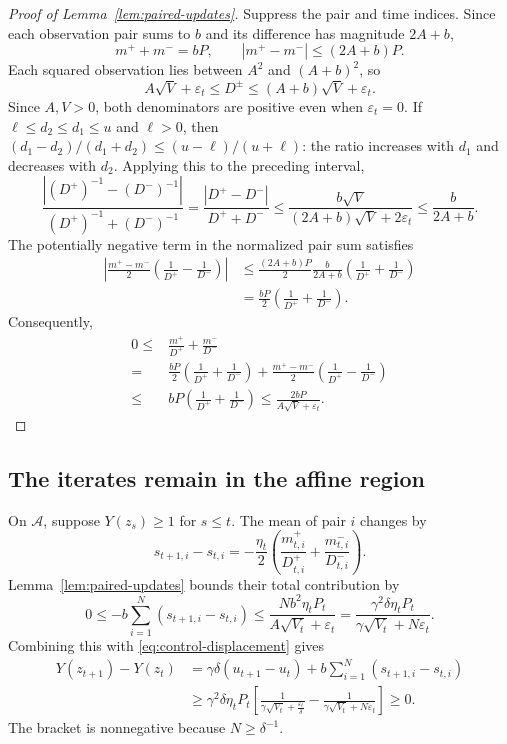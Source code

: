 \documentclass[11pt,letterpaper]{article}
\theoremstyle{definition}
\newcommand{\eps}{\varepsilon}
\begin{document}
\begin{proof}[Proof of Lemma~\ref{lem:paired-updates}]
Suppress the pair and time indices. Since each observation pair sums to
$b$ and its difference has magnitude $2A+b$,
\[
m^++m^-=bP,\qquad |m^+-m^-|\le(2A+b)P.
\]
Each squared observation lies between $A^2$ and $(A+b)^2$, so
\[
A\sqrt V+\eps_t\le D^\pm\le(A+b)\sqrt V+\eps_t.
\]
Since $A,V>0$, both denominators are positive even when $\eps_t=0$.
If $\ell\le d_2\le d_1\le u$ and $\ell>0$, then
$(d_1-d_2)/(d_1+d_2)\le(u-\ell)/(u+\ell)$: the ratio increases with
$d_1$ and decreases with $d_2$. Applying this to the preceding interval,
\begin{equation}
\frac{|(D^+)^{-1}-(D^-)^{-1}|}{(D^+)^{-1}+(D^-)^{-1}}
=\frac{|D^+-D^-|}{D^++D^-}
\le\frac{b\sqrt V}{(2A+b)\sqrt V+2\eps_t}
\le\frac{b}{2A+b}.
\label{eq:pair-denominator-difference}
\end{equation}
The potentially negative term in the normalized pair sum satisfies
\begin{align*}
\left|\frac{m^+-m^-}{2}
\left(\frac1{D^+}-\frac1{D^-}\right)\right|
&\le\frac{(2A+b)P}{2}\frac{b}{2A+b}
\left(\frac1{D^+}+\frac1{D^-}\right)\\
&=\frac{bP}{2}\left(\frac1{D^+}+\frac1{D^-}\right).
\end{align*}
Consequently,
\begin{align*}
0\le{}&
\frac{m^+}{D^+}+\frac{m^-}{D^-}
\\
={}&\frac{bP}{2}\left(\frac1{D^+}+\frac1{D^-}\right)
+\frac{m^+-m^-}{2}\left(\frac1{D^+}-\frac1{D^-}\right)
\\
\le{}& bP\left(\frac1{D^+}+\frac1{D^-}\right)
\le\frac{2bP}{A\sqrt V+\eps_t}.
\end{align*}
\end{proof}

\subsection{The iterates remain in the affine region}

On $\mathcal A$, suppose $Y(z_s)\ge1$ for $s\le t$. The mean of pair $i$
changes by
\[
s_{t+1,i}-s_{t,i}
=-\frac{\eta_t}{2}\left(
\frac{m_{t,i}^{+}}{D_{t,i}^{+}}+
\frac{m_{t,i}^{-}}{D_{t,i}^{-}}\right).
\]
Lemma~\ref{lem:paired-updates} bounds their total contribution by
\begin{equation}
0\le-b\sum_{i=1}^N(s_{t+1,i}-s_{t,i})
\le\frac{Nb^2\eta_tP_t}{A\sqrt{V_t}+\eps_t}
=\frac{\gamma^2\delta\eta_tP_t}{\gamma\sqrt{V_t}+N\eps_t}.
\label{eq:pair-mean-step}
\end{equation}
Combining this with \eqref{eq:control-displacement} gives
\begin{equation}
\begin{aligned}
Y(z_{t+1})-Y(z_t)
&=\gamma\delta(u_{t+1}-u_t)
+b\sum_{i=1}^N(s_{t+1,i}-s_{t,i})\\
&\ge\gamma^2\delta\eta_tP_t
\left[
\frac1{\gamma\sqrt{V_t}+\frac{\eps_t}{\delta}}
-\frac1{\gamma\sqrt{V_t}+N\eps_t}
\right]\ge0.
\end{aligned}
\label{eq:affine-region-preserved}
\end{equation}
The bracket is nonnegative because $N\ge\delta^{-1}$.
\end{document}
